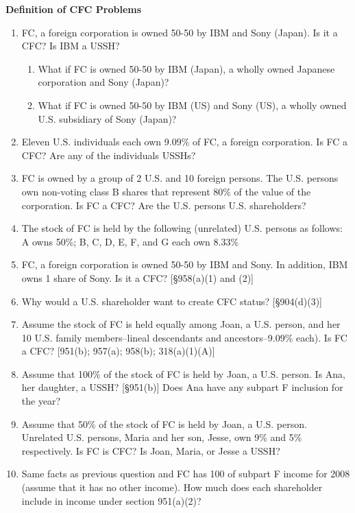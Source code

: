 		
	\begin{center}
		\textbf{Definition of CFC Problems}
	\end{center}
	\begin{select}
	
			\begin{enumerate}
	
	\item FC, a foreign corporation is owned 50-50 by IBM and Sony (Japan).  Is it a CFC?  Is IBM a USSH?
		\begin{enumerate}
			\item What if FC is owned 50-50 by IBM (Japan), a wholly owned Japanese corporation and Sony (Japan)?
			\item What if FC is owned 50-50 by IBM (US) and Sony (US), a wholly owned U.S. subsidiary of Sony (Japan)?
		\end{enumerate}
	\item Eleven U.S. individuals each own 9.09\% of FC, a foreign corporation.  Is FC a CFC?  Are any of the individuals USSHs?
	\item FC is owned by a group of 2 U.S. and 10 foreign persons.  The U.S. persons own non-voting class B shares that represent 80\% of the value of the corporation.  Is FC a CFC?  Are the U.S. persons U.S. shareholders?
	\item The stock of FC is held by the following (unrelated) U.S. persons as follows:  A owns 50\%;  B, C, D, E, F, and G each own 8.33\%
	\item FC, a foreign corporation is owned 50-50 by IBM and Sony.  In addition, IBM owns 1 share of Sony. Is it a CFC? [\S 958(a)(1) and (2)]
	\item Why would a U.S. shareholder want to create CFC status?  [\S 904(d)(3)]
	\item Assume the stock of FC is held equally among Joan, a U.S. person, and her 10 U.S. family members--lineal descendants and ancestors--9.09\% each).  Is FC a CFC? [951(b); 957(a); 958(b); 318(a)(1)(A)]
	\item Assume that 100\% of the stock of FC is held by Joan, a U.S. person.  Is Ana, her daughter, a USSH?  [\S951(b)]  Does Ana have any subpart F inclusion for the year?
	\item Assume that 50\% of the stock of FC is held by Joan, a U.S. person.  Unrelated U.S. persons, Maria and her son, Jesse, own 9\% and 5\% respectively.  Is FC is CFC?  Is Joan, Maria, or Jesse a USSH?  
	\item Same facts as previous question and FC has 100 of subpart F income for 2008 (assume that it has no other income).  How much does each shareholder include in income under section 951(a)(2)? 

\end{enumerate}
\end{select}
